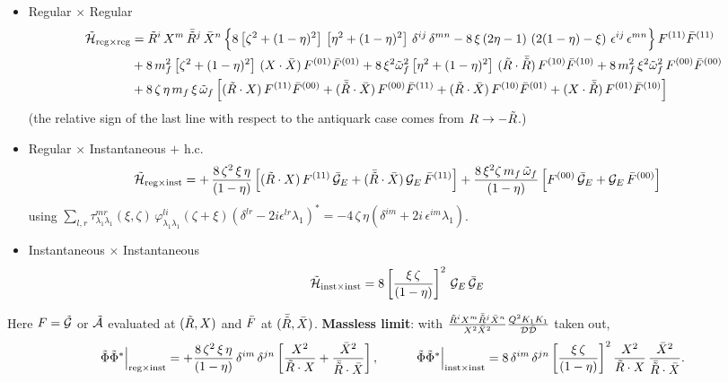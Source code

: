 \documentclass[9pt]{article}
\newcommand{\omq}{\Tilde{\omega}_{f}}        %
\newcommand{\GE}{\mathcal{G}_{E}}            %
\newcommand{\Hs}{\mathcal{H}}
\numberwithin{equation}{section}
\begin{document}
\begin{itemize}
    \item Regular $\times$ Regular
    \begin{align}
        \Tilde{\Hs}_{\text{reg}\times\text{reg}} & = \Tilde{R}^{i}\,X^{m}\,\Bar{\Tilde{R}}^{j}\,\Bar{X}^{n}\,\Big\{8\left[\zeta^{2}+(1-\eta)^{2}\right]\,\left[\eta^{2}+(1-\eta)^{2}\right]\,\delta^{ij}\,\delta^{mn} -8\,\xi\,(2\eta-1)\,\left(2(1-\eta)-\xi\right)\,\epsilon^{ij}\,\epsilon^{mn}\Big\}\,F^{(11)}\Bar{F}^{(11)} \notag \\
        & + 8\,m^{2}_{f}\left[\zeta^{2}+(1-\eta)^{2}\right]\,(X\cdot\Bar{X})\,F^{(01)}\Bar{F}^{(01)} + 8\,\xi^{2}\omq^{2}\left[\eta^{2}+(1-\eta)^{2}\right]\,(\Tilde{R}\cdot\Bar{\Tilde{R}})\,F^{(10)}\Bar{F}^{(10)} + 8\,m^{2}_{f}\,\xi^{2}\omq^{2}\,F^{(00)}\Bar{F}^{(00)} \notag \\
        & + 8\,\zeta\,\eta\,m_{f}\,\xi\,\omq\,\Big[(\Tilde{R}\cdot X)\,F^{(11)}\Bar{F}^{(00)} + (\Bar{\Tilde{R}}\cdot\Bar{X})\,F^{(00)}\Bar{F}^{(11)} + (\Tilde{R}\cdot\Bar{X})\,F^{(10)}\Bar{F}^{(01)} + (X\cdot\Bar{\Tilde{R}})\,F^{(01)}\Bar{F}^{(10)}\Big]
    \end{align}
    (the relative sign of the last line with respect to the antiquark case comes from $R\rightarrow -\Tilde{R}$.)
    \item Regular $\times$ Instantaneous $+$ h.c.
    \begin{align}
        \Tilde{\Hs}_{\text{reg}\times\text{inst}} & = +\,\frac{8\,\zeta^{2}\,\xi\,\eta}{(1-\eta)}\,\Big[(\Tilde{R}\cdot X)\,F^{(11)}\,\Bar{\mathcal{G}}_{E}+(\Bar{\Tilde{R}}\cdot\Bar{X})\,\GE\,\Bar{F}^{(11)}\Big] + \frac{8\,\xi^{2}\zeta\,m_{f}\,\omq}{(1-\eta)}\,\Big[F^{(00)}\,\Bar{\mathcal{G}}_{E}+\GE\,\Bar{F}^{(00)}\Big]
    \end{align}
    using $\sum_{l,r}\tau^{mr}_{\lambda_{1}\lambda_{1}}(\xi,\zeta)\,\varphi^{li}_{\lambda_{1}\lambda_{1}}(\zeta+\xi)\left(\delta^{lr}-2i\epsilon^{lr}\lambda_{1}\right)^{*} = -4\,\zeta\,\eta\left(\delta^{im}+2i\,\epsilon^{im}\lambda_{1}\right)$.
\item Instantaneous $\times$ Instantaneous
    \begin{align}
        \Tilde{\Hs}_{\text{inst}\times\text{inst}} & =  8\left[\frac{\xi\, \zeta}{(1-\eta)}\right]^{2}\,\GE\,\Bar{\mathcal{G}}_{E}
    \end{align}
\end{itemize}
Here $F=\Tilde{\mathcal{G}}$ or $\Tilde{\mathcal{A}}$ evaluated at $(\Tilde{R},X)$ and $\Bar{F}$ at $(\Bar{\Tilde{R}},\Bar{X})$. \textbf{Massless limit}: with $\frac{\Tilde{R}^{i}X^{m}\Bar{\Tilde{R}}^{j}\Bar{X}^{n}}{X^{2}\Bar{X}^{2}}\frac{Q^{2}K_{1}K_{1}}{\mathcal{D}\Bar{\mathcal{D}}}$ taken out,
$$\Tilde{\Phi}\Tilde{\Phi}^{*}\Big|_{\text{reg}\times\text{inst}} = +\frac{8\,\zeta^{2}\,\xi\,\eta}{(1-\eta)}\,\delta^{im}\,\delta^{jn}\left[\frac{X^{2}}{\Tilde{R}\cdot X}+\frac{\Bar{X}^{2}}{\Bar{\Tilde{R}}\cdot\Bar{X}}\right],\hspace{3em} \Tilde{\Phi}\Tilde{\Phi}^{*}\Big|_{\text{inst}\times\text{inst}} = 8\,\delta^{im}\,\delta^{jn}\left[\frac{\xi\,\zeta}{(1-\eta)}\right]^{2}\frac{X^{2}}{\Tilde{R}\cdot X}\,\frac{\Bar{X}^{2}}{\Bar{\Tilde{R}}\cdot\Bar{X}}.$$
\end{document}
